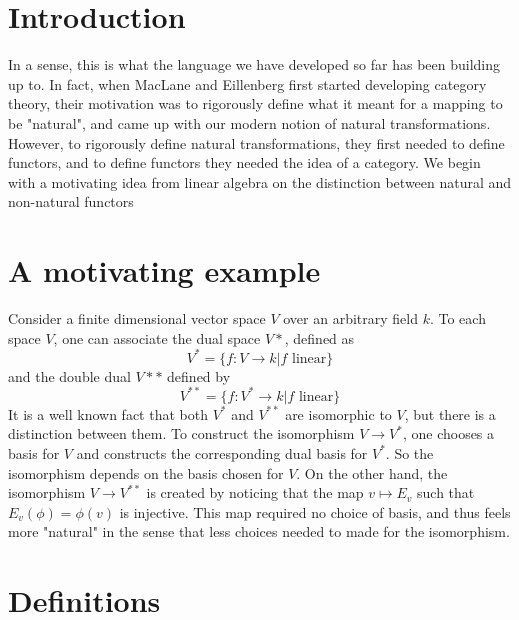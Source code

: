 \section{Introduction}
In a sense, this is what the language we have developed so far has been building up to. In fact, when MacLane and Eillenberg first started developing category theory, their motivation 
was to rigorously define what it meant for a mapping to be "natural", and came up with our modern notion of natural transformations. However, to rigorously define natural transformations,
they first needed to define functors, and to define functors they needed the idea of a category. We begin with a motivating idea from linear algebra on the distinction between natural
and non-natural functors

\section{A motivating example}
Consider a finite dimensional vector space $V$ over an arbitrary field $k$. To each space $V$, one can associate the dual space $V*$, defined as 
\[ V^* = \{ f : V \to k | f \text{ linear} \}  \]
and the double dual $V**$ defined by
\[V^{**} = \{f : V^* \to k | f \text{ linear}\}\] It is a well known fact that both $V^*$ and $V^{**}$ are isomorphic to $V$, but there is a distinction between them. To construct the
isomorphism $V \to V^*$, one chooses a basis for $V$ and constructs the corresponding dual basis for $V^*$. So the isomorphism depends on the basis chosen for $V$. On the other hand, 
the isomorphism $V \to V^{**}$ is created by noticing that the map $v \mapsto E_v$ such that $E_v(\phi) = \phi(v)$ is injective. This map required no choice of basis, and thus feels more
"natural" in the sense that less choices needed to made for the isomorphism. 

\section{Definitions}


